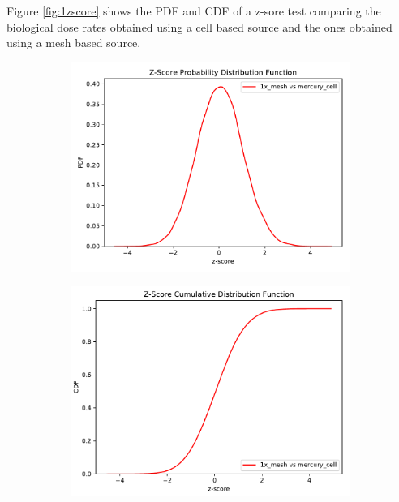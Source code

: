 %
Figure \ref{fig:1zscore} shows the PDF and CDF of a z-sore test comparing the
biological dose rates obtained using a cell based source and the ones obtained
using a mesh based source.
\begin{figure}
	\begin{subfigure}[h]{0.5\textwidth}
		\includegraphics[width=\linewidth, trim={0cm 0cm 0cm 0.9cm},clip]{../figs/toy_p1/PDF_zscore_VPI_1x_orig.pdf}
		\label{fig:1pdf_1x_orig}
	\end{subfigure}\hfill
	\begin{subfigure}[h]{0.5\textwidth}
		\includegraphics[width=\linewidth, trim={0cm 0cm 0cm 0.8cm},clip]{../figs/toy_p1/CDF_zscore_VPI_1x_orig.pdf}
		\label{fig:1cdf_1x_orig}
	\end{subfigure}


\end{figure}

